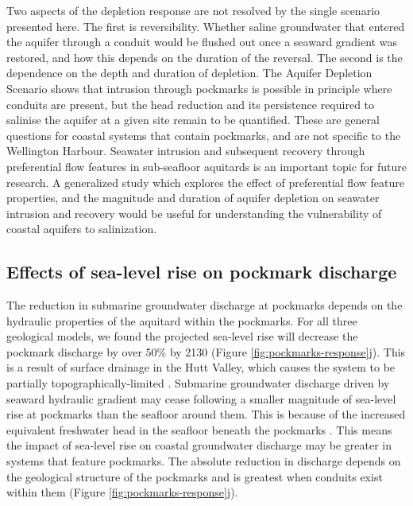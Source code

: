 \documentclass[pdflatex,sn-apa]{sn-jnl}%
\begin{document}
Two aspects of the depletion response are not resolved by the single scenario presented here.
The first is reversibility.
Whether saline groundwater that entered the aquifer through a conduit would be flushed out once a seaward gradient was restored, and how this depends on the duration of the reversal.
The second is the dependence on the depth and duration of depletion.
The Aquifer Depletion Scenario shows that intrusion through pockmarks is possible in principle where conduits are present, but the head reduction and its persistence required to salinise the aquifer at a given site remain to be quantified.
These are general questions for coastal systems that contain pockmarks, and are not specific to the Wellington Harbour.
Seawater intrusion and subsequent recovery through preferential flow features in sub-seafloor aquitards is an important topic for future research.
A generalized study which explores the effect of preferential flow feature properties, and the magnitude and duration of aquifer depletion on seawater intrusion and recovery would be useful for understanding the vulnerability of coastal aquifers to salinization.

\subsection{Effects of sea-level rise on pockmark discharge}
The reduction in submarine groundwater discharge at pockmarks depends on the hydraulic properties of the aquitard within the pockmarks.
For all three geological models, we found the projected sea-level rise will decrease the pockmark discharge by over 50\% by 2130 (Figure \ref{fig:pockmarks-response}j).
This is a result of surface drainage in the Hutt Valley, which causes the system to be partially topographically-limited \citep{bennett_hutt_2024, michael_global_2013}.
Submarine groundwater discharge driven by seaward hydraulic gradient may cease following a smaller magnitude of sea-level rise at pockmarks than the seafloor around them.
This is because of the increased equivalent freshwater head in the seafloor beneath the pockmarks \citep{post_variable_2022}.
This means the impact of sea-level rise on coastal groundwater discharge may be greater in systems that feature pockmarks.
The absolute reduction in discharge depends on the geological structure of the pockmarks and is greatest when conduits exist within them (Figure \ref{fig:pockmarks-response}j).
\end{document}
